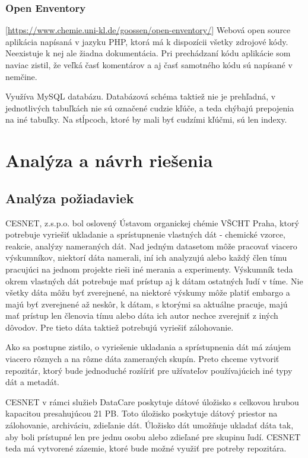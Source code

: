 \documentclass[thesis=M,slovak]{FITthesis}[2013/05/06]
\begin{document}
\subsection{Open Enventory} [\url{https://www.chemie.uni-kl.de/goossen/open-enventory/}]
Webová open source aplikácia napísaná v jazyku PHP, ktorá má k dispozícii všetky zdrojové kódy. Neexistuje k nej ale žiadna dokumentácia. 
Pri prechádzaní kódu aplikácie som naviac zistil, že veľká časť komentárov a aj časť samotného kódu sú napísané v nemčine. 

Využíva MySQL databázu. Databázová schéma taktiež nie je prehľadná, v jednotlivých tabuľkách nie sú označené cudzie kľúče, a teda chýbajú prepojenia na iné tabuľky. Na stĺpcoch, ktoré by mali byť cudzími kľúčmi, sú len indexy.

\chapter{Analýza a návrh riešenia}
\section{Analýza požiadaviek}
CESNET, z.s.p.o. bol oslovený Ústavom organickej chémie VŠCHT Praha, ktorý potrebuje vyriešiť ukladanie a sprístupnenie vlastných dát - chemické vzorce, reakcie, analýzy nameraných dát. Nad jedným datasetom môže pracovať viacero výskumníkov, niektorí dáta namerali, iní ich analyzujú alebo každý člen tímu pracujúci na jednom projekte rieši iné merania a experimenty. Výskumník teda okrem vlastných dát potrebuje mať prístup aj k dátam ostatných ľudí v tíme. Nie všetky dáta môžu byť zverejnené, na niektoré výskumy môže platiť embargo a majú byť zverejnené až neskôr, k dátam, s ktorými sa aktuálne pracuje, majú mať prístup len členovia tímu alebo dáta ich autor nechce zverejniť z iných dôvodov. Pre tieto dáta taktiež potrebujú vyriešiť zálohovanie.

Ako sa postupne zistilo, o vyriešenie ukladania a sprístupnenia dát má záujem viacero rôznych a na rôzne dáta zameraných skupín. Preto chceme vytvoriť repozitár, ktorý bude jednoduché rozšíriť pre užívateľov používajúcich iné typy dát a metadát.

CESNET v rámci služieb DataCare poskytuje dátové úložisko s celkovou hrubou kapacitou presahujúcou 21 PB. Toto úložisko poskytuje dátový priestor na zálohovanie, archiváciu, zdieľanie dát. \cite{DataCare} Úložisko dát umožňuje ukladať dáta tak, aby boli prístupné len pre jednu osobu alebo zdieľané pre skupinu ľudí. \cite {DatoveUloziste} CESNET teda má vytvorené zázemie, ktoré bude možné využiť pre potreby repozitára.
\end{document}
